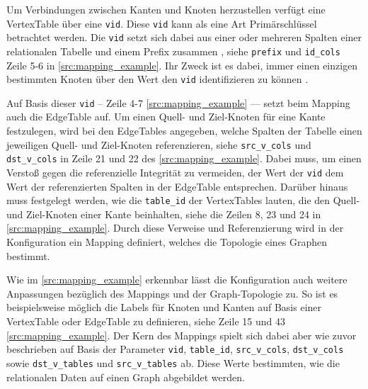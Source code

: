 Um Verbindungen zwischen Kanten und Knoten herzustellen  verfügt eine VertexTable über eine \texttt{vid}. Diese \texttt{vid} kann als eine Art Primärschlüssel betrachtet werden. Die \texttt{vid} setzt sich dabei aus einer oder mehreren Spalten einer relationalen Tabelle und einem Prefix zusammen \cite{sigmod_tian, yt_tian}, siehe \texttt{prefix} und \texttt{id\_cols} Zeile 5-6 in \autoref{src:mapping_example}. Ihr Zweck ist es dabei, immer einen einzigen bestimmten Knoten über den Wert den \texttt{vid} identifizieren zu können \cite{sigmod_tian, yt_tian}. 

Auf Basis dieser \texttt{vid} -- Zeile 4-7 \autoref{src:mapping_example} –– setzt beim Mapping auch die EdgeTable auf. Um einen Quell- und Ziel-Knoten für eine Kante festzulegen, wird bei den EdgeTables angegeben, welche Spalten der Tabelle einen jeweiligen Quell- und Ziel-Knoten referenzieren, siehe \texttt{src\_v\_cols} und \texttt{dst\_v\_cols} in Zeile 21 und 22 des \autoref{src:mapping_example}. Dabei muss, um einen Verstoß gegen die referenzielle Integrität zu vermeiden, der Wert der \texttt{vid} dem Wert der referenzierten Spalten in der EdgeTable entsprechen. Darüber hinaus muss festgelegt werden, wie die \texttt{table\_id} der VertexTables lauten, die den Quell- und Ziel-Knoten einer Kante beinhalten, siehe die Zeilen 8, 23 und 24 in \autoref{src:mapping_example}. Durch diese Verweise und Referenzierung wird in der Konfiguration ein Mapping definiert, welches die Topologie eines Graphen bestimmt. 

Wie im \autoref{src:mapping_example} erkennbar lässt die Konfiguration auch weitere Anpassungen bezüglich des Mappings und der Graph-Topologie zu. So ist es beispielsweise möglich die Labels für Knoten und Kanten auf Basis einer VertexTable oder EdgeTable zu definieren, siehe Zeile 15 und 43 \autoref{src:mapping_example}. Der Kern des Mappings spielt sich dabei aber wie zuvor beschrieben auf Basis der Parameter \texttt{vid}, \texttt{table\_id}, \texttt{src\_v\_cols}, \texttt{dst\_v\_cols} sowie \texttt{dst\_v\_tables} und \texttt{src\_v\_tables} ab. Diese Werte bestimmten, wie die relationalen Daten auf einen Graph abgebildet werden.

